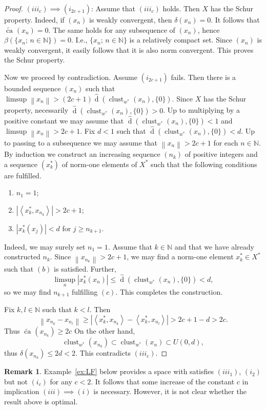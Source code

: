 \documentclass{amsart}
\numberwithin{equation}{section}
\theoremstyle{definition}
\newtheorem{remark}[thm]{Remark}
\def\en{\mathbb N}
\def\ip#1#2{\left\langle#1,#2\right\rangle}
\def\dh{\widehat{\operatorname{d}}}
\def\clu#1{\operatorname{clust}_{w^*}(#1)}
\def\de#1{\delta\left(#1\right)}
\newcommand{\norm}[1]{\left\|#1\right\|}
\newcommand{\wca}[2][]{\widetilde{\operatorname{ca}}_{#1}\left(#2\right)}
\newcommand{\abs}[1]{\left|#1\right|}
\newcommand{\setsep}{;\,}
\begin{document}
\begin{proof}
    
    $(iii_c)\implies(i_{2c+1})$: Assume that $(iii_c)$ holds. Then $X$ has the Schur property. Indeed, if $(x_n)$ is weakly convergent, then $\de{x_n}=0$. It follows that $\wca{x_n}=0$. The same holds for any subsequence of $(x_n)$, hence $\beta(\{x_n\setsep n\in\en\})=0$. I.e., $\{x_n\setsep n\in\en\}$ is a relatively compact set. Since $(x_n)$ is weakly convergent, it easily follows that it is also norm convergent. This proves the Schur property.


    Now we proceed by contradiction. Assume $(i_{2c+1})$ fails. Then there is a bounded sequence $(x_n)$ such that $\limsup\norm{x_n}>(2c+1)\dh(\clu{x_n},\{0\})$. Since $X$ has the Schur property, necessarily $\dh(\clu{x_n},\{0\})>0$. Up to multiplying by a positive constant we may assume that $\dh(\clu{x_n},\{0\})<1$ and $\limsup\norm{x_n}>2c+1$. Fix $d<1$ such that $\dh(\clu{x_n},\{0\})<d$. Up to passing to a subsequence we may assume that $\norm{x_{n}}>2c+1$ for each $n\in\en$. 
    By induction we construct an increasing sequence $(n_k)$ of positive integers and a sequence $(x_k^*)$ of norm-one elements of $X^*$ such that the following conditions are fulfilled.
    \begin{enumerate}[$(a)$]
        \item $n_1=1$;
        \item $\abs{\ip{x_k^*}{x_{n_{k}}}}>2c+1$;
        \item $\abs{x_k^*(x_j)}<d$ for $j\ge n_{k+1}$.
    \end{enumerate}

    Indeed, we may surely set $n_1=1$. Assume that $k\in\en$ and that we have already constructed $n_k$.
    Since $\norm{x_{n_k}}>2c+1$, we may find a norm-one element $x_k^*\in X^*$ such that $(b)$ is satisfied. Further, 
    $$\limsup_n\abs{x_k^*(x_n)}\le\dh(\clu{x_n},\{0\})<d,$$ 
    so we may find $n_{k+1}$ fulfilling $(c)$. This completes the construction.
    
    Fix $k,l\in\en$ such that $k<l$. Then
    $$\norm{x_{n_k}-x_{n_l}}\ge\abs{\ip{x_k^*}{x_{n_k}}-\ip{x_k^*}{x_{n_l}}}>2c+1-d>2c.$$
    Thus $\wca{x_{n_k}}\ge 2c$
    On the other hand,
$$\clu{x_{n_k}}\subset \clu{x_n}\subset U(0,d),$$
thus $\de{x_{n_k}}\le 2d<2$. This contradicts $(iii_c)$.                
\end{proof}


\begin{remark} 
    Example~\ref{ex:LF} below provides a space with satisfies $(iii_1)$, $(i_2)$ but not $(i_c)$ for any $c<2$.
    It follows that some increase of the constant $c$ in implication $(iii)\implies (i)$ is necessary.
    However, it is not clear whether the result above is optimal.
\end{remark}
\end{document}
